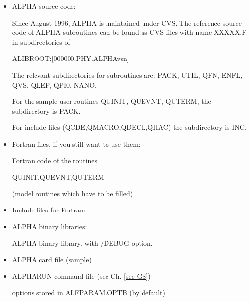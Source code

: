 \begin{itemize}
 
\item ALPHA source code:

Since August 1996, ALPHA is maintained under CVS. The reference source code of ALPHA subroutines can be found
as CVS files with name XXXXX.F  in subdirectories of:

 ALIBROOT:[000000.PHY.ALPHAvsn]

The relevant subdirectories for subroutines are: PACK, UTIL, QFN, ENFL, QVS, QLEP, QPI0, NANO.

For the sample user routines QUINIT, QUEVNT, QUTERM, the subdirectory is PACK.
 
For include files (QCDE,QMACRO,QDECL,QHAC) the subdirectory is INC.
 

\item Fortran files, if you still want to use them:
\begin{indentlist}{ 2.50cm}{ 2.75cm}

Fortran code of the routines
 
QUINIT,QUEVNT,QUTERM
 
(model routines which have to be filled)
\end{indentlist}

\item 
Include files for Fortran:
\begin{indentlist}{ 2.50cm}{ 2.75cm}
\end{indentlist}
 
\item ALPHA binary libraries:
\begin{indentlist}{ 2.50cm}{ 2.75cm}
ALPHA binary library.
with /DEBUG option.
\end{indentlist}
 
\item ALPHA card file (sample)
\begin{indentlist}{ 2.50cm}{ 2.75cm}
\hspace*{1in}
\end{indentlist}
 
\item ALPHARUN command file (see Ch. \ref{sec-GS})
\begin{indentlist}{ 2.50cm}{ 2.75cm}
options stored in ALFPARAM.OPTB (by default)
\end{indentlist}
 

\end{itemize}
